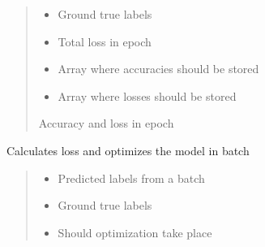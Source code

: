 \documentclass[letterpaper,10pt,english]{sphinxmanual}
\begin{document}
\begin{fulllineitems}
\begin{fulllineitems}
\begin{quote}
\begin{description}
\begin{itemize}
\item {} 
\sphinxAtStartPar
{} \textendash{} Ground true labels

\item {} 
\sphinxAtStartPar
{} \textendash{} Total loss in epoch

\item {} 
\sphinxAtStartPar
{} \textendash{} Array where accuracies should be stored

\item {} 
\sphinxAtStartPar
{} \textendash{} Array where losses should be stored

\end{itemize}

\sphinxAtStartPar
Accuracy and loss in epoch

\end{description}\end{quote}

\end{fulllineitems}


\begin{fulllineitems}
\label{\detokenize{net:net.UVANEMO.__calc_loss}}
\pysigstartsignatures
{}
\pysigstopsignatures
\sphinxAtStartPar
Calculates loss and optimizes the model in batch
\begin{quote}\begin{description}
\begin{itemize}
\item {} 
\sphinxAtStartPar
{} \textendash{} Predicted labels from a batch

\item {} 
\sphinxAtStartPar
{} \textendash{} Ground true labels

\item {} 
\sphinxAtStartPar
{} \textendash{} Should optimization take place


\end{itemize}
\end{description}
\end{quote}
\end{fulllineitems}
\end{fulllineitems}
\end{document}
